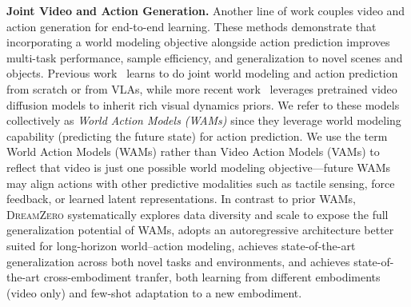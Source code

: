 \documentclass[10pt,logo,copyright]{nvidiatechreport}
\newcommand{\ourmethod}{\mbox{\textsc{DreamZero}}\xspace}
\begin{document}
\textbf{Joint Video and Action Generation.} Another line of work couples video and action generation for end-to-end learning. These methods demonstrate that incorporating a world modeling objective alongside action prediction improves multi-task performance, sample efficiency, and generalization to novel scenes and objects. Previous work~\citep{wu2024unleashing, cheang2024gr, li2025unified, zhu2025unified, zhao2025cot, zheng2025flare, won2025dual} learns to do joint world modeling and action prediction from scratch or from VLAs, while more recent work~\citep{kim2026cosmos, liao2025genie, hu2024video, liang2025video, pai2025mimic} leverages pretrained video diffusion models to inherit rich visual dynamics priors. We refer to these models collectively as \textit{World Action Models (WAMs)} since they leverage world modeling capability (predicting the future state) for action prediction. We use the term World Action Models (WAMs) rather than Video Action Models (VAMs) to reflect that video is just one possible world modeling objective—future WAMs may align actions with other predictive modalities such as tactile sensing, force feedback, or learned latent representations. In contrast to prior WAMs, \ourmethod systematically explores data diversity and scale to expose the full generalization potential of WAMs, adopts an autoregressive architecture better suited for long-horizon world–action modeling, achieves state-of-the-art generalization across both novel tasks and environments, and achieves state-of-the-art cross-embodiment tranfer, both learning from different embodiments (video only) and few-shot adaptation to a new embodiment.
\end{document}
